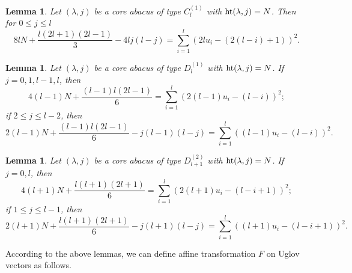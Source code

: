 \documentclass[11pt]{amsart}
\theoremstyle{plain}
\numberwithin{equation}{subsection}
\newtheorem{lemma}[theorem]{Lemma}
\newcommand{\lam}{\lambda}
\begin{document}
\begin{lemma}\label{4.12}
Let $(\lam, j)$ be a core abacus of type $C_l^{(1)}$  with ${\rm ht}(\lambda, j)=N$. 
Then for $0\leq j\leq l$
$$8lN+\frac{l(2l+1)(2l-1)}{3}-4lj(l-j)=\sum_{i=1}^l \left( 2lu_i -( 2(l-i)+1) \right)^2.$$
\end{lemma}

\begin{lemma}\label{4.13}
Let $(\lam, j)$ be a core abacus of type $D_l^{(1)}$ with ${\rm ht}(\lambda, j)=N$.	
If $j=0, 1, l-1, l$, then
$$4(l-1)N+\frac{(l-1)l(2l-1)}{6}=\sum_{i=1}^l \left( 2(l-1)u_i -(l-i) \right)^2;$$
if $2\leq j\leq l-2$, then
$$2(l-1)N+\frac{(l-1)l(2l-1)}{6}-j(l-1)(l-j)=\sum_{i=1}^l \left((l-1)u_i -(l-i) \right)^2.$$
\end{lemma}

\begin{lemma}\label{4.14}
Let $(\lam, j)$ be a core abacus of type $D_{l+1}^{(2)}$  with ${\rm ht}(\lambda, j)=N$.
If $j=0, l$, then
$$4(l+1)N+\frac{l(l+1)(2l+1)}{6}=\sum_{i=1}^l \left( 2(l+1)u_i -(l-i+1) \right)^2;$$
if $1\leq j\leq l-1$, then
$$2(l+1)N+\frac{l(l+1)(2l+1)}{6}-j(l+1)(l-j)=\sum_{i=1}^l \left( (l+1)u_i -(l-i+1) \right)^2.$$
\end{lemma}

According to the above lemmas, we can define affine transformation $F$ on Uglov vectors as follows.
\end{document}
